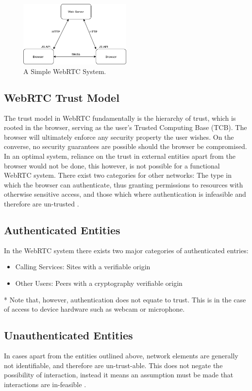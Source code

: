 \begin{figure}[h!]
    \caption{A Simple WebRTC System.}
    \label{image:simpleWebRTCSystem}
    \centering
    \includegraphics[width=0.5\textwidth]{images/simpleWebRTCSystem.png}
\end{figure}

\subsection{WebRTC Trust Model}
The trust model in WebRTC fundamentally is the hierarchy of trust, which is rooted in the browser, serving as the user’s Trusted Computing Base (TCB). The browser will ultimately enforce any security property the user wishes. On the converse, no security guarantees are possible should the browser be compromised. In an optimal system, reliance on the trust in external entities apart from the browser would not be done, this however, is not possible for a functional WebRTC system. There exist two categories for other networks: The type in which the browser can authenticate, thus granting permissions to resources with otherwise sensitive access, and those which where authentication is infeasible and therefore are un-trusted  \cite{rescorla2013webrtc}.

\subsection{Authenticated Entities}
In the WebRTC system there exists two major categories of authenticated entries:
\begin{itemize}
	\item Calling Services: Sites with a verifiable origin
	\item Other Users: Peers with a cryptography verifiable origin
\end{itemize}
* Note that, however, authentication does not equate to trust. This is in the case of access to device hardware such as webcam or microphone. \cite{rescorla2013webrtc}

\subsection{Unauthenticated Entities}
In cases apart from the entities outlined above, network elements are generally not identifiable, and therefore are un-trust-able. This does not negate the possibility of interaction, instead it means an assumption must be made that interactions are in-feasible \cite{rescorla2013webrtc}.

